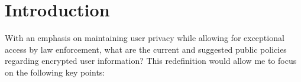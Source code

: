 \documentclass{article}
\begin{document}
\section{Introduction}

With an emphasis on maintaining user privacy while allowing for exceptional access by law enforcement, what are the current and suggested public policies regarding encrypted user information?  This redefinition would allow me to focus on the following key points:

\lipsum[1]\textcite{Saussure1995}

\lipsum[2]\textcite{Labov1972}


\theendnotes
\printbibliography
\end{document}
